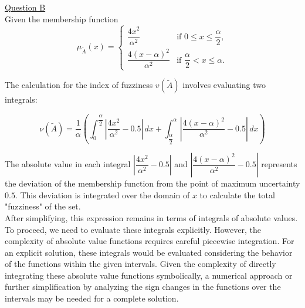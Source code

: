 \underline{Question B}\\
Given the membership function 
\begin{equation}
	\mu_{\tilde{A}}(x) = 
		 \begin{cases} 
		\displaystyle	\dfrac{4x^2}{\alpha^2} & \text{if } 0 \leq x \leq \dfrac{\alpha}{2}, \\
			
		\dfrac{4(x-\alpha)^2}{\alpha^2} & \text{if } \dfrac{\alpha}{2} < x \leq \alpha.
		\end{cases}
\end{equation}

The calculation for the index of fuzziness $v(\tilde{A})$ involves evaluating two integrals:

\begin{equation}
	\nu(\tilde{A}) = \dfrac{1}{\alpha} \left( \int_{0}^{\dfrac{\alpha}{2}} \left| \dfrac{4x^2}{\alpha^2} - 0.5 \right| \, dx + \int_{\dfrac{\alpha}{2}}^{\alpha} \left| \dfrac{4(x-\alpha)^2}{\alpha^2} - 0.5 \right| \, dx \right)
\end{equation}
\label{eq:main_eq}

The absolute value in each integral $\left| \dfrac{4x^2}{\alpha^2} - 0.5 \right|$ and $\left| \dfrac{4(x-\alpha)^2}{\alpha^2} - 0.5 \right|$
represents the deviation of the membership function from the point of maximum uncertainty $0.5$. This deviation is integrated over the domain of $x$ to calculate the total "fuzziness" of the set.\\

After simplifying, this expression remains in terms of integrals of absolute values.
To proceed, we need to evaluate these integrals explicitly. However, the complexity of absolute value functions requires careful piecewise integration. For an explicit solution, these integrals would be evaluated considering the behavior of the functions within the given intervals. Given the complexity of directly integrating these absolute value functions symbolically, a numerical approach or further simplification by analyzing the sign changes in the functions over the intervals may be needed for a complete solution.\\

